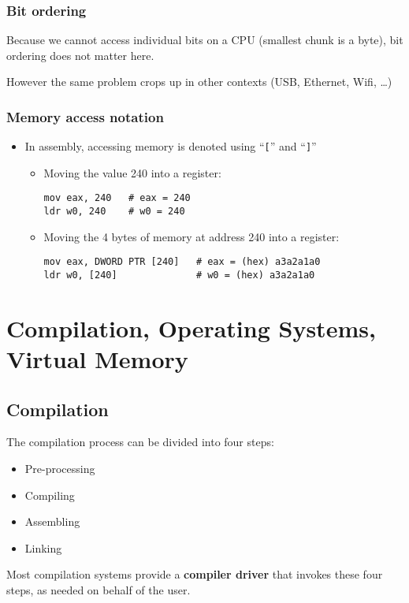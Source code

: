 \documentclass[12pt]{article}
\begin{document}
\subsubsection{Bit ordering}

Because we cannot access individual bits on a CPU (smallest chunk is a byte), 
bit ordering does not matter here.

However the same problem crops up in other contexts (USB, Ethernet, Wifi, \ldots)

\subsubsection{Memory access notation}

\begin{itemize}
\item In assembly, accessing memory is denoted using ``\texttt{[}'' and ``\texttt{]}''
\begin{itemize}
\item Moving the value 240 into a register:
\begin{verbatim}
mov eax, 240   # eax = 240
ldr w0, 240    # w0 = 240
\end{verbatim}

\item Moving the 4 bytes of memory at address 240 into a register:
\begin{verbatim}
mov eax, DWORD PTR [240]   # eax = (hex) a3a2a1a0
ldr w0, [240]              # w0 = (hex) a3a2a1a0
\end{verbatim}
\end{itemize}
\end{itemize}




















\newpage
\section{Compilation, Operating Systems, Virtual Memory}

\subsection{Compilation}
The compilation process can be divided into four steps:
\begin{itemize}
    \item Pre-processing
    \item Compiling
    \item Assembling
    \item Linking
\end{itemize}
Most compilation systems provide a \textbf{compiler driver} that invokes these four steps, as needed on behalf of the user.
\end{document}
